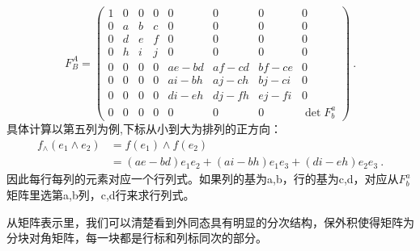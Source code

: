 \begin{equation}
F_B^A=\left(\begin{array}{cccccccc}
1 & 0 & 0 & 0 & 0 & 0 & 0 & 0 \\
0 & a & b & c & 0 & 0 & 0 & 0 \\
0 & d & e & f & 0 & 0 & 0 & 0 \\
0 & h & i & j & 0 & 0 & 0 & 0 \\
0 & 0 & 0 & 0 & a e-b d & a f-c d & b f-c e & 0 \\
0 & 0 & 0 & 0 & a i-b h & a j-c h & b j-c i & 0 \\
0 & 0 & 0 & 0 & d i-e h & d j-f h & e j-f i & 0 \\
0 & 0 & 0 & 0 & 0 & 0 & 0 & \operatorname{det} F_b^a
\end{array}\right) ~.
\end{equation}
具体计算以第五列为例,下标从小到大为排列的正方向：
\begin{equation}
\begin{aligned}
f_\wedge(e_1\wedge e_2)&=f(e_1)\wedge f(e_2)\\
&=(a e-b d)e_1 e_2+(a i-b h)e_1 e_3+ (d i-e h)e_2 e_3~.
\end{aligned}
\end{equation}
因此每行每列的元素对应一个行列式。如果列的基为a,b，行的基为c,d，对应从$F^a_b$矩阵里选第a,b列，c,d行来求行列式。

从矩阵表示里，我们可以清楚看到外同态具有明显的分次结构，保外积使得矩阵为分块对角矩阵，每一块都是行标和列标同次的部分。
